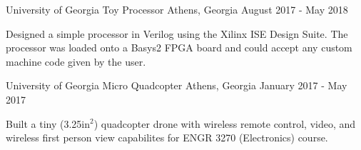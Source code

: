 \begin{cventries}
		\cventry
		{University of Georgia}
		{Toy Processor}
		{Athens, Georgia}
		{August 2017 - May 2018}
		{
			\begin{cvitems}
				\item Designed a simple processor in Verilog using the Xilinx ISE Design Suite. The processor was loaded onto a Basys2 FPGA board and could accept any custom machine code given by the user.
			\end{cvitems}
		}
	\cventry
		{University of Georgia}
		{Micro Quadcopter}
		{Athens, Georgia}
		{January 2017 - May 2017}
		{
			\begin{cvitems}
				\item {Built a tiny (3.25in$^{2}$) quadcopter drone with wireless remote control, video, and wireless first person view capabilites for ENGR 3270 (Electronics) course.}
			\end{cvitems}
		}
\end{cventries}
